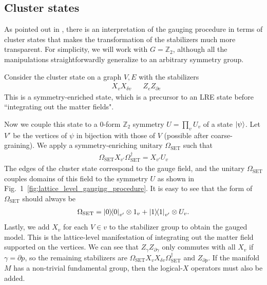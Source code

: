 \documentclass{article}
\theoremstyle{definition}
\theoremstyle{definition}
\newcommand{\Z}{\mathbb Z}
\begin{document}
\subsection{Cluster states}
As pointed out in \cite{sahay_nonabelian}, there is an interpretation of
the gauging procedure in terms of cluster states that makes the transformation of the
stabilizers much more transparent. For simplicity, we will work with $G = \Z_2$,
although all the manipulations straightforwardly generalize to an arbitrary
symmetry group.

Consider the cluster state on a graph $V, E$ with the stabilizers
\begin{align}
  &X_{v}X_{\delta v} & &Z_{e}Z_{\partial e}  \label{eq:clusterstabilizers}
\end{align}
This is a symmetry-enriched state, which is a precursor to an LRE state before
``integrating out the matter fields". 

Now we couple this state to a 0-form $\Z_2$ symmetry $U = \prod_v U_v$ of a
state $\ket{\psi}$. Let $V'$ be the vertices of $\psi$ in bijection with those
of $V$ (possible after coarse-graining). We apply a symmetry-enriching unitary $\Omega_{\mathrm{SET}}$ such that
\begin{align}
\Omega_{\mathrm{SET}}X_{v'} \Omega_{\mathrm{SET}}^\dagger = X_{v'} U_{v}
\end{align}
The edges of the cluster state correspond to the gauge field, and the unitary
$\Omega_{\mathrm{SET}}$ couples domains of this field to the symmetry $U$ as
shown in Fig.~1~\ref{fig:lattice_level_gauging_procedure}.
It is easy to see that the form of $\Omega_{\mathrm{SET}}$ should always be
\begin{align}
  \Omega_{\mathrm{SET}} = \ketbra{0}{0}_{v'} \otimes 1_{v} + \ketbra{1}{1}_{v'} \otimes U_{v}.
\end{align}
Lastly, we add $X_v$ for each $V \in v$ to the stabilizer group to obtain the
gauged model. 
This is the lattice-level manifestation of integrating out the matter field
supported on the vertices.
We can see that $Z_{\gamma}Z_{\partial \gamma}$ only commutes with all $X_v$ if
$\gamma = \partial p$, so the remaining stabilizers are $\Omega_{\mathrm{SET}} X_vX_{\delta v}\Omega^\dagger_{\mathrm{SET}}$ and
$Z_{\partial p}$. If the
manifold $M$ has a non-trivial fundamental group, then the logical-$X$ operators
must also be added.
\end{document}

